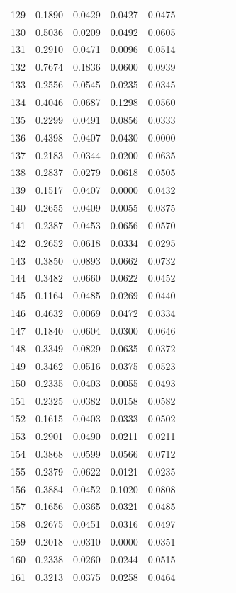\begin{table}
\begin{tabular}{cccccccccc}
129& 0.1890& 0.0429& 0.0427& 0.0475\\ 
130& 0.5036& 0.0209& 0.0492& 0.0605\\ 
131& 0.2910& 0.0471& 0.0096& 0.0514\\ 
132& 0.7674& 0.1836& 0.0600& 0.0939\\ 
133& 0.2556& 0.0545& 0.0235& 0.0345\\ 
134& 0.4046& 0.0687& 0.1298& 0.0560\\ 
135& 0.2299& 0.0491& 0.0856& 0.0333\\ 
136& 0.4398& 0.0407& 0.0430& 0.0000\\ 
137& 0.2183& 0.0344& 0.0200& 0.0635\\ 
138& 0.2837& 0.0279& 0.0618& 0.0505\\ 
139& 0.1517& 0.0407& 0.0000& 0.0432\\ 
140& 0.2655& 0.0409& 0.0055& 0.0375\\ 
141& 0.2387& 0.0453& 0.0656& 0.0570\\ 
142& 0.2652& 0.0618& 0.0334& 0.0295\\ 
143& 0.3850& 0.0893& 0.0662& 0.0732\\ 
144& 0.3482& 0.0660& 0.0622& 0.0452\\ 
145& 0.1164& 0.0485& 0.0269& 0.0440\\ 
146& 0.4632& 0.0069& 0.0472& 0.0334\\ 
147& 0.1840& 0.0604& 0.0300& 0.0646\\ 
148& 0.3349& 0.0829& 0.0635& 0.0372\\ 
149& 0.3462& 0.0516& 0.0375& 0.0523\\ 
150& 0.2335& 0.0403& 0.0055& 0.0493\\ 
151& 0.2325& 0.0382& 0.0158& 0.0582\\ 
152& 0.1615& 0.0403& 0.0333& 0.0502\\ 
153& 0.2901& 0.0490& 0.0211& 0.0211\\ 
154& 0.3868& 0.0599& 0.0566& 0.0712\\ 
155& 0.2379& 0.0622& 0.0121& 0.0235\\ 
156& 0.3884& 0.0452& 0.1020& 0.0808\\ 
157& 0.1656& 0.0365& 0.0321& 0.0485\\ 
158& 0.2675& 0.0451& 0.0316& 0.0497\\ 
159& 0.2018& 0.0310& 0.0000& 0.0351\\ 
160& 0.2338& 0.0260& 0.0244& 0.0515\\ 
161& 0.3213& 0.0375& 0.0258& 0.0464\\ 

\end{tabular}
\end{table}
